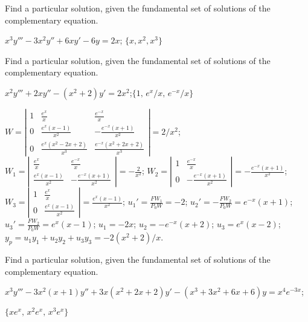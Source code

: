 \documentclass{ximera}
\begin{document}
\begin{problem}\label{exer:9.4.3} 
Find a particular
solution, given the fundamental set of solutions of the complementary equation.

$x^3y'''-3x^2y''+6xy'-6y=2x$;
 \quad  $\{x,x^2,x^3\}$
\end{problem}

\begin{problem}\label{exer:9.4.4}
Find a particular
solution, given the fundamental set of solutions of the complementary equation.

$x^2y'''+2xy''-(x^2+2)y'=2x^2$;\quad   $\{1,\,e^x/x,\,e^{-x}/x\}$

\begin{solution}
$W=\left|\begin{array}{cccc}
1&\frac{e^x}{x}&\frac{e^{-x}}{x}\\
0&\frac{e^x(x-1)}{x^2}&-\frac{e^{-x}(x+1)}{x^2}\\
0&\frac{e^x(x^2-2x+2)}{x^3}&\frac{e^{-x}(x^2+2x+2)}{x^3}
\end{array}\right|=2/x^2$;
$W_1=\left|\begin{array}{cccc}
\frac{e^x}{x}&\frac{e^{-x}}{x}
\\\frac{e^x(x-1)}{x^2}&-\frac{e^{-x}(x+1)}{x^2}
\end{array}\right|=-\frac{2}{x^2}$;
$W_2=
\left|\begin{array}{cccc}1&\frac{e^{-x}}{x}\\
0&-\frac{e^{-x}(x+1)}{x^2}
\end{array}\right|=-\frac{e^{-x}(x+1)}{x^2}$;
$W_3=\left|\begin{array}{cccc}
1&\frac{e^x}{x}\\
0&\frac{e^x(x-1)}{x^2}
\end{array}\right|=\frac{e^x(x-1)}{x^2}$;
$u_1'=\frac{FW_1}{P_0W}=-2$;
$u_2'=-\frac{FW_2}{P_0W}=e^{-x}(x+1)$;
$u_3'=\frac{FW_2}{P_0W}=e^x(x-1)$;
$u_1=-2x$;
$u_2=-e^{-x}(x+2)$;
$u_3=e^x(x-2)$;
$y_p=u_1y_1+u_2y_2+u_3y_3=-2(x^2+2)/x$.
\end{solution}
\end{problem}

\begin{problem}\label{exer:9.4.5}
Find a particular
solution, given the fundamental set of solutions of the complementary equation.

$x^3y'''-3x^2(x+1)y''+3x(x^2+2x+2)y'-(x^3+3x^2+6x+6)y=x^4e^{-3x}$;\quad

$\{xe^x,\,x^2e^x,\,x^3e^x\}$
\end{problem}
\end{document}
